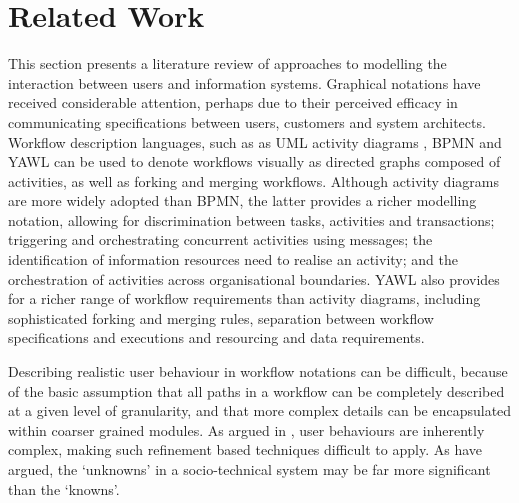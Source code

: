 \documentclass{llncs}
\begin{document}

\section{Related Work}
\label{sec:related}


This section presents a literature review of approaches to modelling the interaction between users and information
systems.  Graphical notations have received considerable attention, perhaps due to their perceived efficacy in
communicating specifications between users, customers and system architects.  Workflow description languages, such as as
UML activity diagrams \citep{omg07omguml}, BPMN \citep{omg2011omgbpmn} and YAWL \citep{hofstede2010yawl} can be used to
denote workflows visually as directed graphs composed of activities, as well as
forking and merging workflows.  Although activity diagrams are more widely
adopted than BPMN, the latter provides a richer modelling notation, allowing for discrimination between tasks, activities and transactions; triggering and
orchestrating concurrent activities using messages; the identification of information resources need to realise an
activity; and the orchestration of activities across organisational boundaries. YAWL also provides for a richer range of
workflow requirements than activity diagrams, including sophisticated forking and merging rules, separation between
workflow specifications and executions and resourcing and data requirements.

Describing realistic user behaviour in workflow notations can be difficult, because of the basic assumption that all
paths in a workflow can be completely described at a given level of granularity, and that more complex details can be
encapsulated within coarser grained modules.  As argued in , user behaviours are
inherently complex, making such refinement based techniques difficult to apply.  As
\citet{israilidis13ignorance} have argued, the `unknowns' in a socio-technical system may be far more significant than
the `knowns'. 
\end{document}
